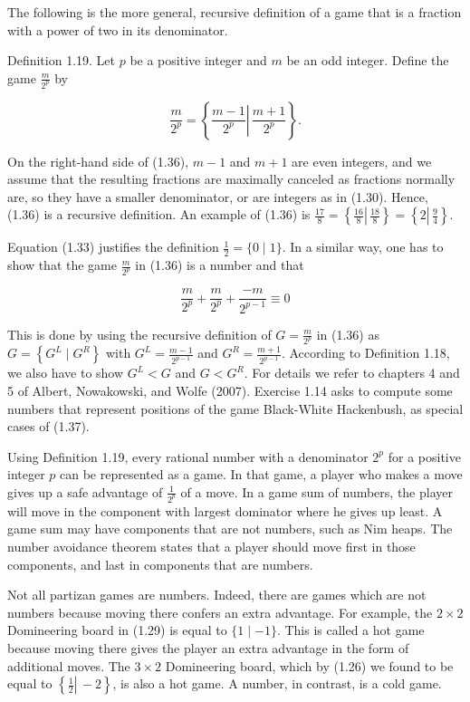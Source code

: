 \documentclass[12pt]{article}
\begin{document}
The following is the more general, recursive definition of a game that is a fraction with a power of two in its denominator.

Definition 1.19. Let $p$ be a positive integer and $m$ be an odd integer. Define the game $\frac{m}{2^{p}}$ by


\begin{equation*}
\frac{m}{2^{p}}=\left\{\left.\frac{m-1}{2^{p}} \right\rvert\, \frac{m+1}{2^{p}}\right\} . \tag{1.36}
\end{equation*}


On the right-hand side of (1.36), $m-1$ and $m+1$ are even integers, and we assume that the resulting fractions are maximally canceled as fractions normally are, so they have a smaller denominator, or are integers as in (1.30). Hence, (1.36) is a recursive definition. An example of (1.36) is $\frac{17}{8}=\left\{\left.\frac{16}{8} \right\rvert\, \frac{18}{8}\right\}=\left\{2 \left\lvert\, \frac{9}{4}\right.\right\}$.

Equation (1.33) justifies the definition $\frac{1}{2}=\{0 \mid 1\}$. In a similar way, one has to show that the game $\frac{m}{2^{p}}$ in (1.36) is a number and that


\begin{equation*}
\frac{m}{2^{p}}+\frac{m}{2^{p}}+\frac{-m}{2^{p-1}} \equiv 0 \tag{1.37}
\end{equation*}


This is done by using the recursive definition of $G=\frac{m}{2^{p}}$ in (1.36) as $G=\left\{G^{L} \mid G^{R}\right\}$ with $G^{L}=\frac{m-1}{2^{p-1}}$ and $G^{R}=\frac{m+1}{2^{p-1}}$. According to Definition 1.18, we also have to show $G^{L}<G$ and $G<G^{R}$. For details we refer to chapters 4 and 5 of Albert, Nowakowski, and Wolfe (2007). Exercise 1.14 asks to compute some numbers that represent positions of the game Black-White Hackenbush, as special cases of (1.37).

Using Definition 1.19, every rational number with a denominator $2^{p}$ for a positive integer $p$ can be represented as a game. In that game, a player who makes a move gives up a safe advantage of $\frac{1}{2^{p}}$ of a move. In a game sum of numbers, the player will move in the component with largest dominator where he gives up least. A game sum may have components that are not numbers, such as Nim heaps. The number avoidance theorem states that a player should move first in those components, and last in components that are numbers.

Not all partizan games are numbers. Indeed, there are games which are not numbers because moving there confers an extra advantage. For example, the $2 \times 2$ Domineering board in (1.29) is equal to $\{1 \mid-1\}$. This is called a hot game because moving there gives the player an extra advantage in the form of additional moves. The $3 \times 2$ Domineering board, which by (1.26) we found to be equal to $\left\{\left.\frac{1}{2} \right\rvert\,-2\right\}$, is also a hot game. A number, in contrast, is a cold game.
\end{document}
